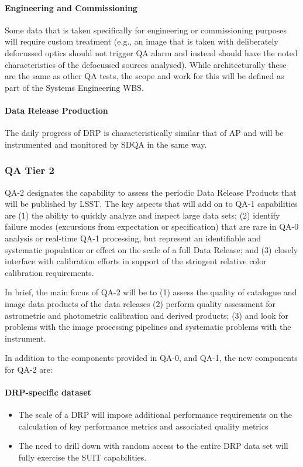 \paragraph{Engineering and Commissioning}

Some data that is taken specifically for engineering or commissioning purposes will require custom treatment (e.g., an image that is taken with deliberately defocussed optics should not trigger QA alarm and instead should have the noted characteristics of the defocussed sources analysed). While architecturally these are the same as other QA tests, the scope and work for this will be defined as part of the Systems Engineering WBS.

\paragraph{Data Release Production}

The daily progress of DRP is characteristically similar that of AP and will be instrumented and monitored by SDQA in the same way.

\subsubsection{QA Tier 2}

QA-2 designates the capability to assess the periodic Data Release Products that will be published by LSST.  The key aspects that will add on to QA-1 capabilities are (1) the ability to quickly analyze and inspect large data sets; (2) identify failure modes (excursions from expectation or specification) that are rare in QA-0 analysis or real-time QA-1 processing, but represent an identifiable and systematic population or effect on the scale of a full Data Release; and (3) closely interface with calibration efforts in support of the stringent relative color calibration requirements.

In brief, the main focus of QA-2 will be to (1) assess the quality of catalogue and image data products of the data releases (2) perform quality assessment for astrometric and photometric calibration and derived products; (3) and look for problems with the image processing pipelines and systematic problems with the instrument.

In addition to the components provided in QA-0, and QA-1, the new components for QA-2 are:

\paragraph{DRP-specific dataset}
\label{sec:qaDrpDataset}
\begin{itemize}
\item The scale of a DRP will impose additional performance requirements on the calculation of key performance metrics and associated quality metrics
\item The need to drill down with random access to the entire DRP data set will fully exercise the SUIT capabilities.
\end{itemize}


